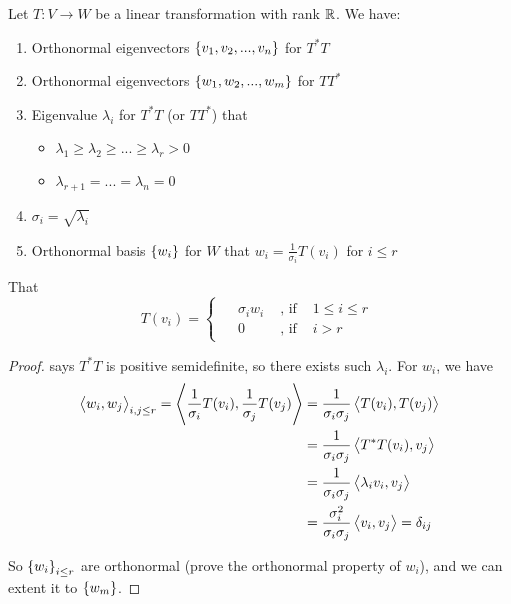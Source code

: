 \begin{theorem}[SVD]
    Let $T: V \rightarrow W$ be a linear transformation with rank $\mathbb{R}$. We have:
    \begin{enumerate}
        \item Orthonormal eigenvectors $\set{v_1, v_2, ..., v_n}$ for $T^*T$
        \item Orthonormal eigenvectors $\set{w_1, w_2, ..., w_m}$ for $TT^*$
        \item Eigenvalue $\lambda_i$ for $T^*T$ (or $TT^*$) that
                \begin{itemize}
                    \item $\lambda_1 \geq \lambda_2 \geq ... \geq \lambda_r > 0$
                    \item $\lambda_{r+1} = ... = \lambda_n = 0$
                \end{itemize}
        \item $\sigma_i = \sqrt{\lambda_i}$
        \item Orthonormal basis $\set{w_i}$ for $W$ that $\displaystyle w_i = \frac{1}{\sigma_i} T(v_i)$ for $i \leq r$
    \end{enumerate}
    
    That 
    \begin{equation}
        T(v_i) = \begin{cases}
        \begin{aligned}
            &\sigma_i w_i & \text { , if } & 1 \leq i \leq r \\
            & 0 & \text{ , if } & i > r
        \end{aligned}            
        \end{cases}
    \end{equation}
\end{theorem}
\begin{proof}
     says $T^*T$ is positive semidefinite, so there exists such $\lambda_i$. For $w_i$, we have
    \begin{equation}
        \begin{aligned}
            \left\langle \displaystyle w_i, w_j \right\rangle_{i,j \leq r} = \left\langle \displaystyle \frac{1}{\sigma_i} T(v_i), \frac{1}{\sigma_j} T(v_j) \right\rangle &= \frac{1}{\sigma_i \sigma_j} \left\langle \displaystyle T(v_i), T(v_j) \right\rangle \\
             &= \frac{1}{\sigma_i \sigma_j} \left\langle \displaystyle T^*T(v_i), v_j \right\rangle \\
             &= \frac{1}{\sigma_i \sigma_j} \left\langle \displaystyle \lambda_i v_i, v_j \right\rangle \\
             &= \frac{\sigma_i^2}{\sigma_i \sigma_j} \left\langle \displaystyle v_i, v_j \right\rangle = \delta_{ij}
        \end{aligned}        
    \end{equation}
    
    So $\set{w_i}_{i \leq r}$ are orthonormal (prove the orthonormal property of $w_i$), and we can extent it to $\set{w_m}$.
\end{proof}


